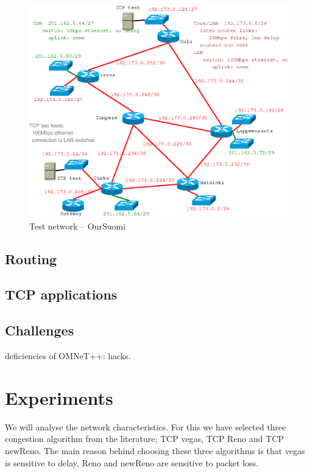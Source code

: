 \documentclass[conference,a4paper]{../../sty/IEEEtran}
\begin{document}
\begin{figure}[h]
\begin{center}
\includegraphics[scale=0.5]{plan.eps}
\caption{Test network -- OurSuomi}
\label{fig1}
\end{center}
\end{figure}

\subsection{Routing}

\subsection{TCP applications}

\subsection{Challenges}
deficiencies of OMNeT++: hacks.


\section{Experiments}

We will analyse the network characteristics. For this we have selected three congestion algorithm from the literature; TCP vegas, TCP Reno and TCP newReno. The main reason behind choosing these three algorithms is that vegas is sensitive to delay, Reno and newReno are sensitive to packet loss.
\end{document}
